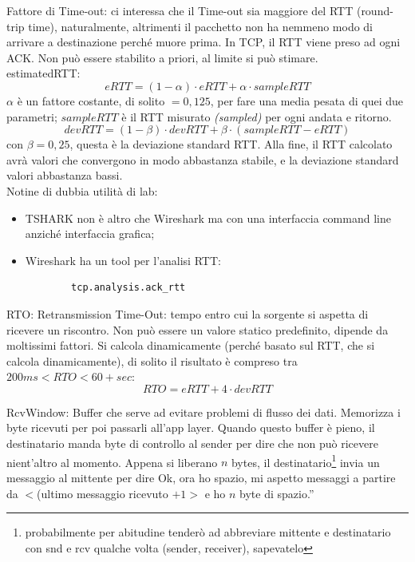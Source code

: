 \noindent Fattore di Time-out: ci interessa che il Time-out sia maggiore del RTT (round-trip time), naturalmente, altrimenti il pacchetto non ha nemmeno modo di arrivare a destinazione perché muore prima. In TCP, il RTT viene preso ad ogni ACK. Non può essere stabilito a priori, al limite si può stimare.\\

\noindent estimatedRTT:
\[eRTT = (1-\alpha)\cdot eRTT + \alpha \cdot sampleRTT\]
\noindent $\alpha$ è un fattore costante, di solito $=0,125$, per fare una media pesata di quei due parametri; $sampleRTT$ è il RTT misurato \textit{(sampled)} per ogni andata e ritorno.\\

\[devRTT = (1-\beta)\cdot devRTT + \beta \cdot (sampleRTT - eRTT)\]
\noindent con $\beta = 0,25$, questa è la deviazione standard RTT. Alla fine, il RTT calcolato avrà valori che convergono in modo abbastanza stabile, e la deviazione standard valori abbastanza bassi.\\

\noindent Notine di dubbia utilità di lab:
\begin{itemize}
    \item TSHARK non è altro che Wireshark ma con una interfaccia command line anziché interfaccia grafica;
    \item Wireshark ha un tool per l'analisi RTT: \begin{verbatim}
        tcp.analysis.ack_rtt
    \end{verbatim}
\end{itemize}

\noindent {}RTO: Retransmission Time-Out: tempo entro cui la sorgente si aspetta di ricevere un riscontro. Non può essere un valore statico predefinito, dipende da moltissimi fattori. Si calcola dinamicamente (perché basato sul RTT, che si calcola dinamicamente), di solito il risultato è compreso tra $200ms<RTO<60+sec$:
\[RTO = eRTT + 4 \cdot devRTT\]

\noindent {}RcvWindow: Buffer che serve ad evitare problemi di flusso dei dati. Memorizza i byte ricevuti per poi passarli all'app layer. Quando questo buffer è pieno, il destinatario manda byte di controllo al sender per dire che non può ricevere nient'altro al momento. Appena si liberano $n$ bytes, il destinatario\footnote{probabilmente per abitudine tenderò ad abbreviare mittente e destinatario con snd e rcv qualche volta (sender, receiver), sapevatelo} invia un messaggio al mittente per dire \openapex Ok, ora ho spazio, mi aspetto messaggi a partire da $<$(ultimo messaggio ricevuto $+1>$ e ho $n$ byte di spazio.''
\newpage
{}
